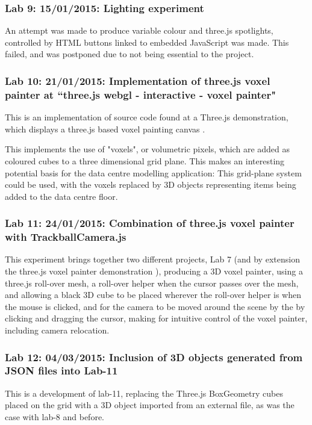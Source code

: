 \subsubsection{Lab 9: 15/01/2015: Lighting experiment}
\label{subSubSec:ThreeJSExperiment:Lab9}
An attempt was made to produce variable colour and three.js spotlights, controlled by HTML buttons linked to embedded JavaScript was made. This failed, and was postponed due to not being essential to the project.

\subsubsection{Lab 10: 21/01/2015: Implementation of three.js voxel painter at ``three.js webgl - interactive - voxel painter"}
\label{subSubSec:ThreeJSExperiments:Lab10}
This is an implementation of source code found at a Three.js demonstration, which displays a three.js based voxel painting canvas \cite{ThreeJSVoxelPainter}.

This implements the use of "voxels", or volumetric pixels, which are added as coloured cubes to a three dimensional grid plane. This makes an interesting potential basis for the data centre modelling application: This grid-plane system could be used, with the voxels replaced by 3D objects representing items being added to the data centre floor.

\subsubsection{Lab 11: 24/01/2015: Combination of three.js voxel painter with TrackballCamera.js}
\label{subSubSec:ThreeJSExperiments:Lab11}
This experiment brings together two different projects, Lab 7 (and by extension the three.js voxel painter demonstration \cite{ThreeJSVoxelPainter}), producing a 3D voxel painter, using a three.js roll-over mesh, a roll-over helper when the cursor passes over the mesh, and allowing a black 3D cube to be placed wherever the roll-over helper is when the mouse is clicked, and for the camera to be moved around the scene by the by clicking and dragging the cursor, making for intuitive control of the voxel painter, including camera relocation.

\subsubsection{Lab 12: 04/03/2015: Inclusion of 3D objects generated from JSON files into Lab-11}
\label{subSubSec:ThreeJSExperiments:Lab12}
This is a development of lab-11, replacing the Three.js BoxGeometry cubes placed on the grid with a 3D object imported from an external file, as was the case with lab-8 and before.

